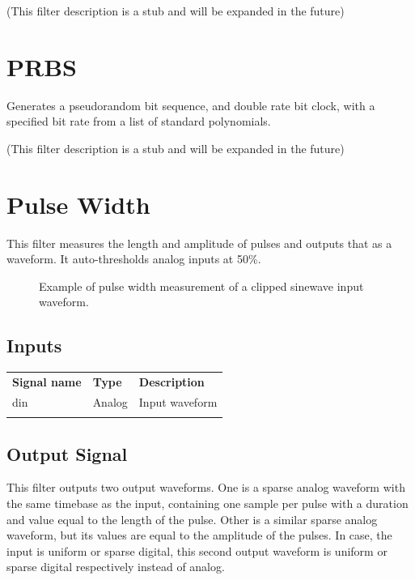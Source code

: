 (This filter description is a stub and will be expanded in the future)

\pagebreak
\section{PRBS}

Generates a pseudorandom bit sequence, and double rate bit clock, with a specified bit rate from a list of standard
polynomials.

(This filter description is a stub and will be expanded in the future)

\pagebreak
\section{Pulse Width}
\label{filter:pulsewidth}

This filter measures the length and amplitude of pulses and outputs that as a waveform. It auto-thresholds analog inputs at 50\%.

\begin{figure}[h]
\centering
{}
\caption{Example of pulse width measurement of a clipped sinewave input waveform.}
\label{filter_pulsewidth}
\end{figure}

\subsection{Inputs}

\begin{tabularx}{16cm}{llX}
\thickhline
\textbf{Signal name} & \textbf{Type} & \textbf{Description} \\
\thickhline
din & Analog & Input waveform \\
\thickhline
\end{tabularx}

\subsection{Output Signal}

This filter outputs two output waveforms. One is a sparse analog waveform with the same timebase as the input, containing one sample per pulse with
a duration and value equal to the length of the pulse. Other is a similar sparse analog waveform, but its values are equal to the amplitude of the pulses. In case,
the input is uniform or sparse digital, this second output waveform is uniform or sparse digital respectively instead of analog.

